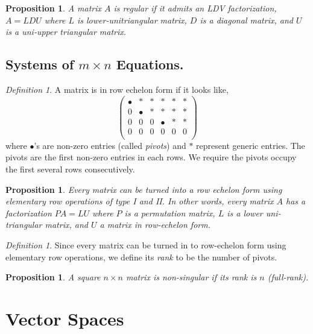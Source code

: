 \documentclass[12pt]{amsart}
\newtheorem{proposition}[theorem]{Proposition}
\theoremstyle{remark}
\newtheorem{definition}[theorem]{Definition}
\numberwithin{equation}{section}
\begin{document}
\begin{proposition}
	A matrix $A$ is regular if it admits an LDV factorization, $A=LDU$ where $L$ is lower-unitriangular matrix, $D$ is a diagonal matrix, and $U$ is a uni-upper triangular matrix.
\end{proposition}
\subsection{Systems of $m\times n$ Equations.}
\begin{definition}
A matrix is in row echelon form if it looks like,
	\[
\begin{pmatrix}
\bullet & * & * & * & * & * \\
0 & \bullet & * & * & * & * \\
0 & 0 & 0 & \bullet & * & * \\
0 & 0 & 0 & 0 & 0 & 0 \\
\end{pmatrix}
\]
where $\bullet$'s are non-zero entries (called \emph{pivots}) and $*$ represent generic entries. The pivots are the first non-zero entries in each rows. We require the pivots occupy the first several rows consecutively.
\end{definition}
\begin{proposition}
	Every matrix can be turned into a row echelon form using elementary row operations of type I and II. In other words, every matrix $A$ has a factorization $PA=LU$ where $P$ is a permutation matrix, $L$ is a lower uni-triangular matrix, and $U$ a matrix in row-echelon form.
\end{proposition}
\begin{definition}
	Since every matrix can be turned in to row-echelon form using elementary row operations, we define its \emph{rank} to be the number of pivots.
\end{definition}
\begin{proposition}
	A square $n\times n$ matrix is non-singular if its rank is $n$ (full-rank).
\end{proposition}



\section{Vector Spaces}
\end{document}
